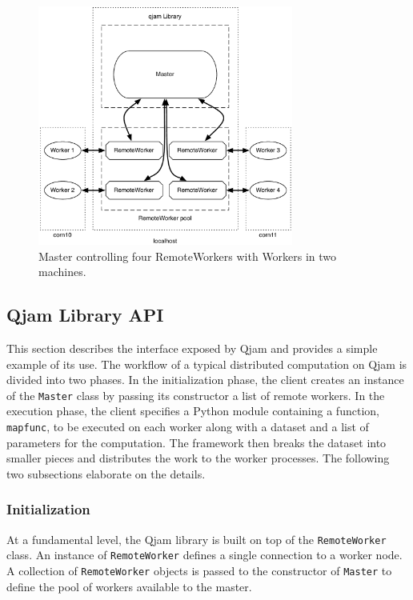 \documentclass[%
  final,
  notitlepage,
  narroweqnarray,
  inline,
]{ieee}
\begin{document}
\begin{figure}[h!]
  \begin{center}
    \includegraphics[width=3.3in]{fwk_diagram/fwk_diagram.pdf}
  \end{center}
  \caption{Master controlling four RemoteWorkers with Workers in two machines.}
  \label{diagram}
\end{figure}

\subsection{Qjam Library API}
\label{Library}

This section describes the interface exposed by Qjam and provides a simple
example of its use. The workflow of a typical distributed computation on Qjam
is divided into two phases. In the initialization phase, the client creates an
instance of the \texttt{Master} class by passing its constructor a list of
remote workers. In the execution phase, the client specifies a Python module
containing a function, \texttt{mapfunc}, to be executed on each worker along
with a dataset and a list of parameters for the computation. The framework then
breaks the dataset into smaller pieces and distributes the work to the worker
processes. The following two subsections elaborate on the details.

\subsubsection{Initialization}

At a fundamental level, the Qjam library is built on top of the
\texttt{RemoteWorker} class. An instance of \texttt{RemoteWorker} defines a
single connection to a worker node. A collection of \texttt{RemoteWorker}
objects is passed to the constructor of \texttt{Master} to define the pool of
workers available to the master.
\end{document}
